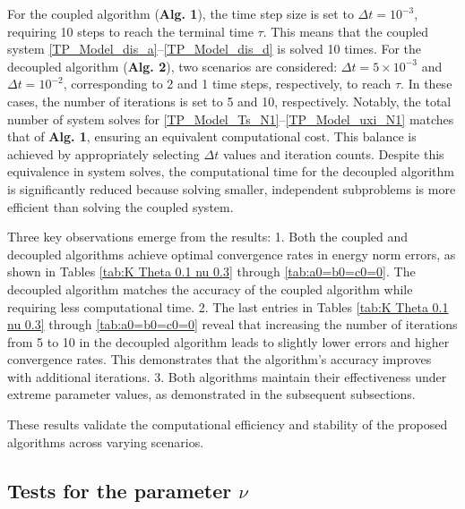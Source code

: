 \documentclass{article}
\numberwithin{equation}{section}
\begin{document}
For the coupled algorithm (\textbf{Alg. 1}), the time step size is set to \(\Delta t = 10^{-3}\), requiring 10 steps to reach the terminal time \(\tau\). This means that the coupled system \eqref{TP_Model_dis_a}–\eqref{TP_Model_dis_d} is solved 10 times. For the decoupled algorithm (\textbf{Alg. 2}), two scenarios are considered: \(\Delta t = 5 \times 10^{-3}\) and \(\Delta t = 10^{-2}\), corresponding to 2 and 1 time steps, respectively, to reach \(\tau\). In these cases, the number of iterations is set to 5 and 10, respectively. Notably, the total number of system solves for \eqref{TP_Model_Ts_N1}–\eqref{TP_Model_uxi_N1} matches that of \textbf{Alg. 1}, ensuring an equivalent computational cost. This balance is achieved by appropriately selecting \(\Delta t\) values and iteration counts. Despite this equivalence in system solves, the computational time for the decoupled algorithm is significantly reduced because solving smaller, independent subproblems is more efficient than solving the coupled system.

Three key observations emerge from the results:
1. Both the coupled and decoupled algorithms achieve optimal convergence rates in energy norm errors, as shown in Tables \ref{tab:K Theta 0.1 nu 0.3} through \ref{tab:a0=b0=c0=0}. The decoupled algorithm matches the accuracy of the coupled algorithm while requiring less computational time.
2. The last entries in Tables \ref{tab:K Theta 0.1 nu 0.3} through \ref{tab:a0=b0=c0=0} reveal that increasing the number of iterations from 5 to 10 in the decoupled algorithm leads to slightly lower errors and higher convergence rates. This demonstrates that the algorithm's accuracy improves with additional iterations.
3. Both algorithms maintain their effectiveness under extreme parameter values, as demonstrated in the subsequent subsections. 

These results validate the computational efficiency and stability of the proposed algorithms across varying scenarios.



\subsection{Tests for the parameter $\nu$}
\end{document}
